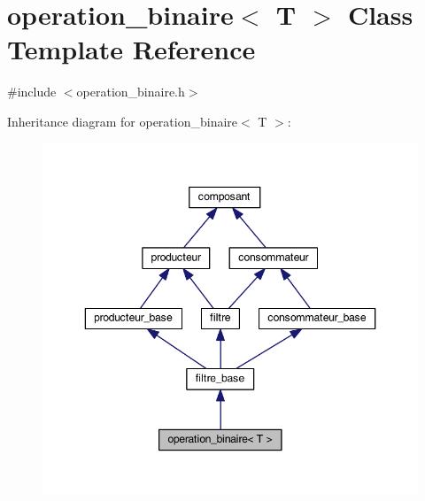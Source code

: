 \hypertarget{classoperation__binaire}{\section{operation\-\_\-binaire$<$ T $>$ Class Template Reference}
\label{classoperation__binaire}
}


{\ttfamily \#include $<$operation\-\_\-binaire.\-h$>$}



Inheritance diagram for operation\-\_\-binaire$<$ T $>$\-:
\nopagebreak
\begin{figure}[H]
\begin{center}
\leavevmode
\includegraphics[width=346pt]{classoperation__binaire__inherit__graph}
\end{center}
\end{figure}


